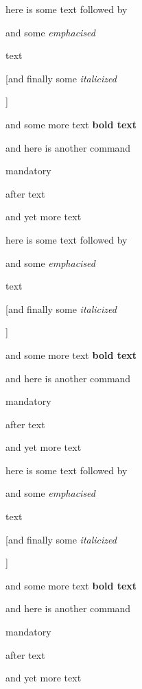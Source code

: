 here is some text followed by 

{and some \emph{emphacised} 

	text}

[and finally some \itshape{italicized}

] 

and
some more text \textbf{bold text} 

and here is another command \cmh[optional]

{mandatory} 

after text  

and yet more text

here is some text followed by 

{and some \emph{emphacised} 

	text}

[and finally some \itshape{italicized}

] 

and
some more text \textbf{bold text} 

and here is another command \cmh[optional]

{mandatory} 

after text  

and yet more text

here is some text followed by 

{and some \emph{emphacised} 

	text}

[and finally some \itshape{italicized}

] 

and
some more text \textbf{bold text} 

and here is another command \cmh[optional]

{mandatory} 

after text  

and yet more text
